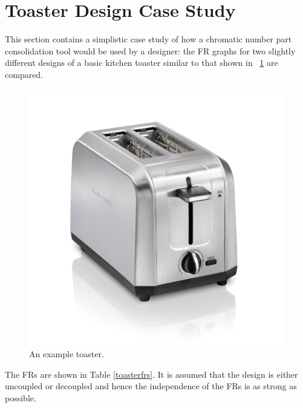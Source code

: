 \section{Toaster Design Case Study}

This section contains a simplistic case study of how a chromatic number part consolidation tool would be used by a
designer: the FR graphs for two slightly different designs of a basic kitchen toaster similar to that shown in
\figurename~\ref{fig:toaster} are compared.

\begin{figure}[H]
  \begin{center}
    \includegraphics[scale=0.2]{toaster}
  \end{center}
  \caption{An example toaster.}
  \label{fig:toaster}
\end{figure}

The FRs are shown in Table \ref{toasterfrs}.  It is assumed that the design is either uncoupled or decoupled and
hence the independence of the FRs is as strong as possible.

